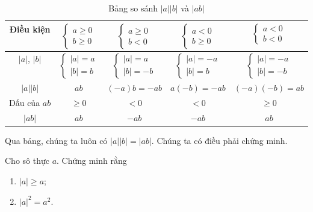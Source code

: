\begin{table}[H]
   \centering
   \begin{tabular}{|c||c|c|c|c|}
      \hline
      Điều kiện & $\begin{cases}a\geq 0\\b\geq0\end{cases}$ & $\begin{cases}a\geq0\\b<0\end{cases}$ & $\begin{cases}a<0\\b\geq 0\end{cases}$ & $\begin{cases}a<0\\b<0\end{cases}$ \\
      \hline
      $|a|$, $|b|$ & $\begin{cases}|a| = a\\|b| = b\end{cases}$ & $\begin{cases}|a| = a\\|b| = -b\end{cases}$ & $\begin{cases}|a| = -a\\|b| = b\end{cases}$ & $\begin{cases}|a| = -a\\|b| = -b\end{cases}$ \\
      \hline
      $|a||b|$ & $ab$ & $(-a)b = -ab$ & $a(-b) = -ab$ & $(-a)(-b) = ab$ \\
      \hline
      Dấu của $ab$ & $\geq 0$ & $< 0$ & $<0$ & $\geq 0$ \\
      \hline
      $|ab|$ & $ab$ & $-ab$ & $-ab$ & $ab$ \\
      \hline
   \end{tabular}
   \caption{Bảng so sánh $|a||b|$ và $|ab|$}
\end{table}

Qua bảng, chúng ta luôn có $|a||b| = |ab|$. Chúng ta có điều phải chứng minh.

\exercise Cho sô thực $a$. Chứng minh rằng
\begin{multicols}{2}
   \begin{enumerate}
      \item $|a| \geq a$;
      \item $|a|^2 = a^2$.
   \end{enumerate}
\end{multicols}

